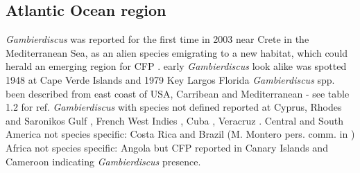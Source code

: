 \documentclass[12pt]{article}
\begin{document}
\subsection{Atlantic Ocean region}
\emph{Gambierdiscus} was reported for the first time in 2003 near Crete in the Mediterranean Sea, as an alien species emigrating to a new habitat, which could herald an emerging region for CFP \cite{aligizaki2008morphological}.
early \emph{Gambierdiscus} look alike was spotted 1948 at Cape Verde Islands \cite{silva1956contribution} and 1979 Key Largos Florida \cite{taylor1979description}
\emph{Gambierdiscus} spp. been described from east coast of USA, Carribean and Mediterranean - see table 1.2 for ref.
\emph{Gambierdiscus} with species not defined reported at Cyprus, Rhodes and Saronikos Gulf \cite{aligizaki2009toxic,aligizaki2010diversity}, French West Indies \cite{lobel1988assessment}, Cuba \cite{delgado2006epiphytic}, Veracruz \cite{okolodkov2007seasonal}.
Central and South America not species specific: Costa Rica and Brazil (M. Montero pers. comm. in \cite{parsons2012gambierdiscus})
Africa not species specific: Angola \cite{berdalet2012global} but CFP reported in Canary Islands and Cameroon \cite{bienfang2008ciguatera} indicating \emph{Gambierdiscus} presence.
\end{document}
